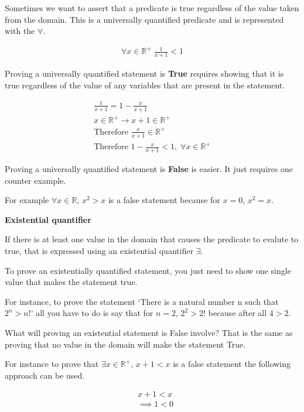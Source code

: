 \documentclass[12pt]{article}
\begin{document}
Sometimes we want to assert that a predicate is true regardless of the value taken from the domain. This is a universally quantified predicate and is represented with the $\forall$.

\begin{align*}
\forall x \in \mathbb{R^+} \; \frac{1}{x+1} < 1
\end{align*}

Proving a universally quantified statement is \textbf{True} requires showing that it is true regardless of the value of any variables that are present in the statement.

\begin{align*}
\frac{1}{x+1} = 1 - \frac{x}{x+1} \\
x \in \mathbb{R^+} \rightarrow x + 1 \in \mathbb{R^+} \\
\text{Therefore } \frac{x}{x+1} \in \mathbb{R^+}\\
\text{Therefore } 1 - \frac{x}{x+1} < 1, \; \forall x \in \mathbb{R^+} 
\end{align*}

Proving a universally quantified statement is \textbf{False} is easier. It just requires one counter example.

For example $\forall x \in \mathbb{R}, \, x^2 > x$ is a false statement because for $x = 0$, $x^2 = x$.

\medskip

\textbf{Existential quantifier}

If there is at least one value in the domain that causes the predicate to evalute to true, that is expressed using an existential quantifier $\exists$.

To prove an existentially quantified statement, you just need to show one single value that makes the statement true.

For instance, to prove the statement `There is a natural number n such that $2^n > n!$' all you have to do is say that for $n=2$, $2^2 > 2!$ because after all $4 > 2$.

What will proving an existential statement is False involve? That is the same as proving that no value in the domain will make the statement True.

For instance to prove that $\exists x \in \mathbb{R^+}, \, x + 1 < x$ is a false statement the following approach can be used.

\begin{align*}
& x + 1 < x 
\\ & \implies 1 < 0 \tag{ by subtracting x from both sides}
\end{align*}
\end{document}

